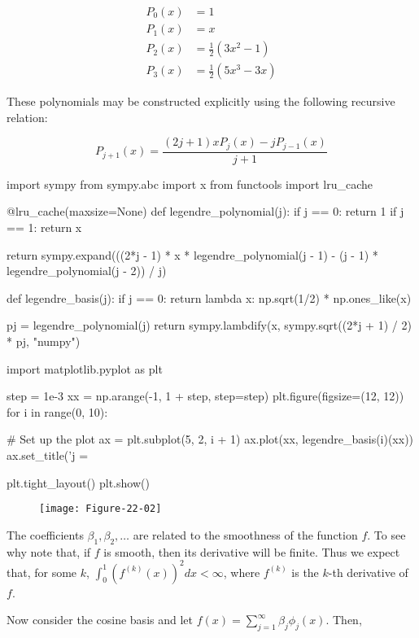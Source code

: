 \begin{align*}
P_{0}(x) &= 1 \\
P_{1}(x) &= x \\
P_{2}(x) &= \frac{1}{2}\left( 3x^{2} - 1 \right) \\
P_{3}(x) &= \frac{1}{2}\left( 5x^{3} - 3x \right)
\end{align*}

These polynomials may be constructed explicitly using the following
recursive relation:

\[ P_{j+1}(x) = \frac{(2j + 1) x P_{j}(x) - j P_{j - 1}(x)}{j + 1} \]

\begin{python}
import sympy
from sympy.abc import x
from functools import lru_cache

@lru_cache(maxsize=None)
def legendre_polynomial(j):
    if j == 0:
        return 1
    if j == 1:
        return x
    
    return sympy.expand(((2*j - 1) * x * legendre_polynomial(j - 1) - (j - 1) * legendre_polynomial(j - 2)) / j)

def legendre_basis(j):
    if j == 0:
        return lambda x: np.sqrt(1/2) * np.ones_like(x)
    
    pj = legendre_polynomial(j)
    return sympy.lambdify(x, sympy.sqrt((2*j + 1) / 2) * pj, "numpy")
\end{python}

\begin{python}
import matplotlib.pyplot as plt

step = 1e-3
xx = np.arange(-1, 1 + step, step=step)
plt.figure(figsize=(12, 12))
for i in range(0, 10):
    
    # Set up the plot
    ax = plt.subplot(5, 2, i + 1)
    ax.plot(xx, legendre_basis(i)(xx))
    ax.set_title('j = %

plt.tight_layout()
plt.show()
\end{python}

\begin{figure}[H]
\centering
\texttt{[image: Figure-22-02]}
\end{figure}

The coefficients \(\beta_{1}, \beta_{2}, \dots\) are related to the
smoothness of the function \(f\). To see why note that, if \(f\) is
smooth, then its derivative will be finite. Thus we expect that, for
some \(k\), \(\int_{0}^{1} (f^{(k)}(x))^{2} dx < \infty\), where \(f^{(k)}\)
is the \(k\)-th derivative of \(f\).

Now consider the cosine basis and let
\(f(x) = \sum_{j=1}^{\infty} \beta_{j} \phi_{j}(x)\). Then,

